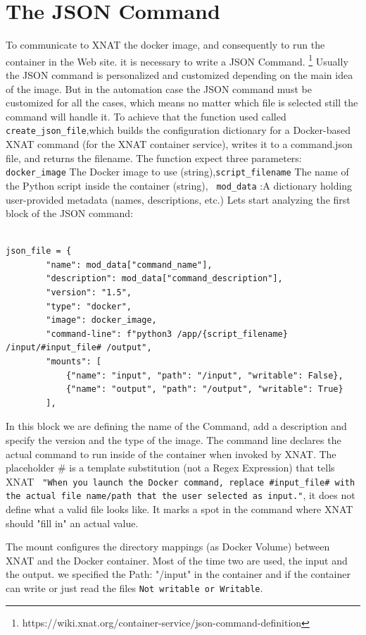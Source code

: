 \section{The JSON Command}

To communicate to XNAT the docker image, and consequently to run the container in the Web site. it is necessary to write a JSON Command. 
\footnote{https://wiki.xnat.org/container-service/json-command-definition}
Usually the JSON command is personalized and customized depending on the main idea of the image. But in the automation case the JSON command must be customized for all the cases, which means no matter which file is  selected still the command will handle it.
To achieve that the function used called \texttt{create\_json\_file},which builds the configuration dictionary for a Docker-based XNAT command (for the XNAT container service), writes it to a command.json file, and returns the filename.
The function expect three parameters:
\texttt{docker\_image} The Docker image to use (string),\texttt{script\_filename} The name of the Python script inside the container (string), \texttt{ mod\_data} :A dictionary holding user-provided metadata (names, descriptions, etc.)
Lets start analyzing the first block of the JSON command:
\begin{lstlisting}

json_file = {
        "name": mod_data["command_name"],
        "description": mod_data["command_description"],
        "version": "1.5",
        "type": "docker",
        "image": docker_image,
        "command-line": f"python3 /app/{script_filename} /input/#input_file# /output",
        "mounts": [
            {"name": "input", "path": "/input", "writable": False},
            {"name": "output", "path": "/output", "writable": True}
        ],
\end{lstlisting}


In this block we are  defining the name of the Command, add a description and specify the version and the type of the image.
The command line declares the actual command to run inside of the container when invoked by XNAT. The placeholder \# is a template substitution (not a Regex Expression)  that tells XNAT \texttt{ "When you launch the Docker command, replace \#input\_file\# with the actual file name/path that the user selected as input."}, it does not define what a valid file looks like. It marks a spot in the command where XNAT should "fill in" an actual value.

The mount configures the directory mappings (as Docker Volume) between XNAT and the Docker container. Most of the time two are used, the input and the output.
we specified the Path: "/input" in the container and if the container can write or just read the files  \texttt{Not writable or Writable}.

